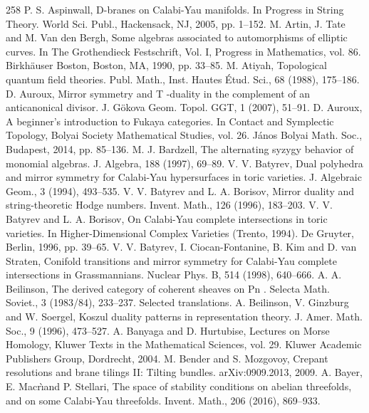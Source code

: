 \begin{thebibliography}{258}
\hypertarget{ref:16}{} P. S. Aspinwall, D-branes on Calabi-Yau manifolds. In Progress in String Theory. World Sci. Publ., Hackensack, NJ, 2005, pp. 1–152.
\hypertarget{ref:17}{} M. Artin, J. Tate and M. Van den Bergh, Some algebras associated to automorphisms of elliptic curves. In The Grothendieck Festschrift, Vol. I, Progress in Mathematics, vol. 86. Birkhäuser Boston, Boston, MA, 1990, pp. 33–85.
\hypertarget{ref:18}{} M. Atiyah, Topological quantum field theories. Publ. Math., Inst. Hautes Étud. Sci., 68 (1988), 175–186.
\hypertarget{ref:19}{} D. Auroux, Mirror symmetry and T -duality in the complement of an anticanonical divisor. J. Gökova Geom. Topol. GGT, 1 (2007), 51–91.
\hypertarget{ref:20}{} D. Auroux, A beginner’s introduction to Fukaya categories. In Contact and Symplectic Topology, Bolyai Society Mathematical Studies, vol. 26. János Bolyai Math. Soc., Budapest, 2014, pp. 85–136.
\hypertarget{ref:21}{} M. J. Bardzell, The alternating syzygy behavior of monomial algebras. J. Algebra, 188 (1997), 69–89.
\hypertarget{ref:22}{} V. V. Batyrev, Dual polyhedra and mirror symmetry for Calabi-Yau hypersurfaces in toric varieties. J. Algebraic Geom., 3 (1994), 493–535.
\hypertarget{ref:23}{} V. V. Batyrev and L. A. Borisov, Mirror duality and string-theoretic Hodge numbers. Invent. Math., 126 (1996), 183–203.
\hypertarget{ref:24}{} V. V. Batyrev and L. A. Borisov, On Calabi-Yau complete intersections in toric varieties. In Higher-Dimensional Complex Varieties (Trento, 1994). De Gruyter, Berlin, 1996, pp. 39–65.
\hypertarget{ref:25}{} V. V. Batyrev, I. Ciocan-Fontanine, B. Kim and D. van Straten, Conifold transitions and mirror symmetry for Calabi-Yau complete intersections in Grassmannians. Nuclear Phys. B, 514 (1998), 640–666.
\hypertarget{ref:26}{} A. A. Beilinson, The derived category of coherent sheaves on Pn . Selecta Math. Soviet., 3 (1983/84), 233–237. Selected translations.
\hypertarget{ref:27}{} A. Beilinson, V. Ginzburg and W. Soergel, Koszul duality patterns in representation theory. J. Amer. Math. Soc., 9 (1996), 473–527.
\hypertarget{ref:28}{} A. Banyaga and D. Hurtubise, Lectures on Morse Homology, Kluwer Texts in the Mathematical Sciences, vol. 29. Kluwer Academic Publishers Group, Dordrecht, 2004.
\hypertarget{ref:29}{} M. Bender and S. Mozgovoy, Crepant resolutions and brane tilings II: Tilting bundles. arXiv:0909.2013, 2009.
\hypertarget{ref:30}{} A. Bayer, E. Macrı̀and P. Stellari, The space of stability conditions on abelian threefolds, and on some Calabi-Yau threefolds. Invent. Math., 206 (2016), 869–933.

\end{thebibliography}

